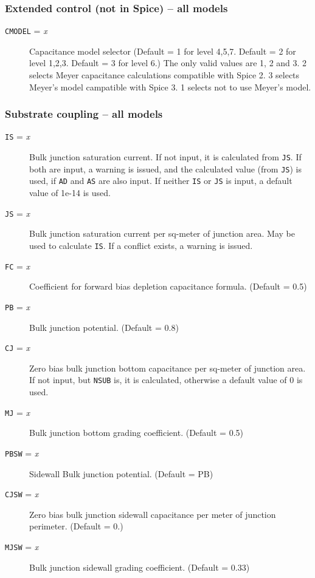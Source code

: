\subsubsection{Extended control (not in Spice) -- all models}
\begin{description}

\item[{\tt CMODEL} = {\it x}] Capacitance model selector 
(Default = 1 for level 4,5,7.  Default = 2 for level 1,2,3.  Default =
3 for level 6.)  The only valid values are 1, 2 and 3.  2 selects
Meyer capacitance calculations compatible with Spice 2.  3 selects
Meyer's model campatible with Spice 3.  1 selects not to use Meyer's
model.

\end{description}
\subsubsection{Substrate coupling -- all models}
\begin{description}

\item[{\tt IS} = {\it x}] Bulk junction saturation current.  If not input,
it is calculated from {\tt JS}.  If both are input, a warning is
issued, and the calculated value (from {\tt JS}) is used, if {\tt AD}
and {\tt AS} are also input.  If neither {\tt IS} or {\tt JS} is
input, a default value of 1e-14 is used.

\item[{\tt JS} = {\it x}] Bulk junction saturation current per sq-meter of
junction area.  May be used to calculate {\tt IS}.  If a conflict
exists, a warning is issued.

\item[{\tt FC} = {\it x}] Coefficient for forward bias depletion capacitance
formula. (Default = 0.5)

\item[{\tt PB} = {\it x}] Bulk junction potential. (Default = 0.8)

\item[{\tt CJ} = {\it x}] Zero bias bulk junction bottom capacitance per
sq-meter of junction area.  If not input, but {\tt NSUB} is, it is
calculated, otherwise a default value of 0 is used.

\item[{\tt MJ} = {\it x}] Bulk junction bottom grading
coefficient.  (Default = 0.5)

\item[{\tt PBSW} = {\it x}] Sidewall Bulk junction potential. (Default = PB)

\item[{\tt CJSW} = {\it x}] Zero bias bulk junction sidewall
capacitance per meter of junction perimeter. (Default = 0.)

\item[{\tt MJSW} = {\it x}] Bulk junction sidewall grading coefficient.
(Default = 0.33)

\end{description}
